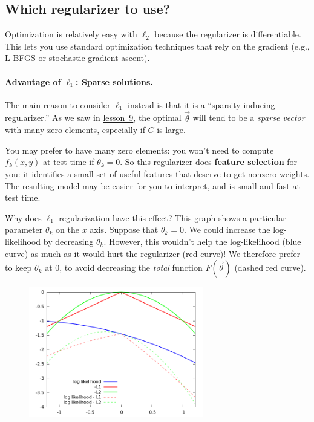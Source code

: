 \documentclass[11pt]{article}
\newcommand{\vtheta}{\vec{\theta}}
\newcommand{\lesson}[1]{\href{http://cs.jhu.edu/~jason/tutorials/loglin/\##1}{lesson~#1}}
\begin{document}
\subsection{Which regularizer to use?}

%

Optimization is relatively easy with $\ell_2$ because the regularizer
is differentiable.  This lets you use standard optimization techniques
that rely on the gradient (e.g., L-BFGS or stochastic gradient ascent).

\paragraph{Advantage of $\ell_1$:  Sparse solutions.}  The main reason to consider $\ell_1$ instead is that it is a ``sparsity-inducing regularizer.''  As we saw in \lesson{9}, the optimal $\vtheta$ will tend to be a {\em sparse vector} with many zero elements, especially if $C$ is large.

You may prefer to have many zero elements: you won't need to compute $f_k(x,y)$ at test time if $\theta_k=0$.  So this regularizer does {\bf feature selection} for you: it identifies a small set of useful features that deserve to get nonzero weights.  The resulting model may be easier for you to interpret, and is small and fast at test time.

Why does $\ell_1$ regularization have this effect?  This graph shows a particular parameter $\theta_k$ on the $x$ axis.  Suppose that $\theta_k=0$.  We could increase the log-likelihood by decreasing $\theta_k$.  However, this wouldn't help the log-likelihood (blue curve) as much as it would hurt the regularizer (red curve)!  We therefore prefer to keep $\theta_k$ at 0, to avoid decreasing the {\em total} function $F(\vtheta)$ (dashed red curve).

\begin{figure}
\includegraphics[width=3in]{L1-L2}
\end{figure}
\end{document}
